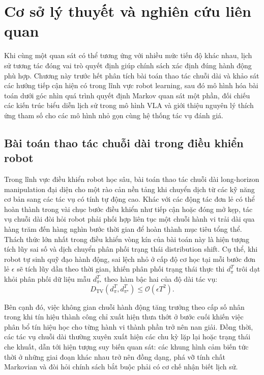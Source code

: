 \chapter{Cơ sở lý thuyết và nghiên cứu liên quan}

Khi cùng một quan sát có thể tương ứng với nhiều mức tiến độ khác nhau, lịch sử tương tác đóng vai trò quyết định giúp chính sách xác định đúng hành động phù hợp. Chương này trước hết phân tích bài toán thao tác chuỗi dài và khảo sát các hướng tiếp cận hiện có trong lĩnh vực robot learning, sau đó mô hình hóa bài toán dưới góc nhìn quá trình quyết định Markov quan sát một phần, đối chiếu các kiến trúc biểu diễn lịch sử trong mô hình VLA và giới thiệu nguyên lý thích ứng tham số cho các mô hình nhỏ gọn cùng hệ thống tác vụ đánh giá.

\section{Bài toán thao tác chuỗi dài trong điều khiển robot}

Trong lĩnh vực điều khiển robot học sâu, bài toán thao tác chuỗi dài long-horizon manipulation đại diện cho một rào cản nền tảng khi chuyển dịch từ các kỹ năng cơ bản sang các tác vụ có tính tự động cao. Khác với các động tác đơn lẻ có thể hoàn thành trong vài chục bước điều khiển như tiếp cận hoặc đóng mở kẹp, tác vụ chuỗi dài đòi hỏi robot phải phối hợp liên tục một chuỗi hành vi trải dài qua hàng trăm đến hàng nghìn bước thời gian để hoàn thành mục tiêu tổng thể. Thách thức lớn nhất trong điều khiển vòng kín của bài toán này là hiện tượng tích lũy sai số và dịch chuyển phân phối trạng thái distribution shift. Cụ thể, khi robot tự sinh quỹ đạo hành động, sai lệch nhỏ ở cấp độ cơ học tại mỗi bước đơn lẻ $\epsilon$ sẽ tích lũy dần theo thời gian, khiến phân phối trạng thái thực thi $d_\pi^T$ trôi dạt khỏi phân phối dữ liệu mẫu $d_{\pi^\star}^T$ theo hàm bậc hai của độ dài tác vụ:
\begin{equation}
D_{\mathrm{TV}}\left(d_\pi^T, d_{\pi^\star}^T\right) \le \mathcal{O}(\epsilon T^2).
\label{eq:compounding-error}
\end{equation}

Bên cạnh đó, việc không gian chuỗi hành động tăng trưởng theo cấp số nhân trong khi tín hiệu thành công chỉ xuất hiện thưa thớt ở bước cuối khiến việc phân bổ tín hiệu học cho từng hành vi thành phần trở nên nan giải. Đồng thời, các tác vụ chuỗi dài thường xuyên xuất hiện các chu kỳ lặp lại hoặc trạng thái che khuất, dẫn tới hiện tượng suy biến quan sát: các khung hình cảm biến tức thời ở những giai đoạn khác nhau trở nên đồng dạng, phá vỡ tính chất Markovian và đòi hỏi chính sách bắt buộc phải có cơ chế nhận biết lịch sử.

